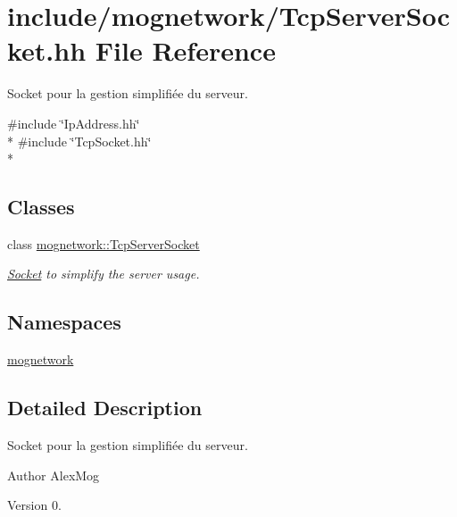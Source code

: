 \hypertarget{_tcp_server_socket_8hh}{\section{include/mognetwork/\-Tcp\-Server\-Socket.hh File Reference}
\label{_tcp_server_socket_8hh}
}


Socket pour la gestion simplifiée du serveur.  


{\ttfamily \#include \char`\"{}Ip\-Address.\-hh\char`\"{}}\\*
{\ttfamily \#include \char`\"{}Tcp\-Socket.\-hh\char`\"{}}\\*
\subsection*{Classes}
\begin{DoxyCompactItemize}
\item 
class \hyperlink{classmognetwork_1_1_tcp_server_socket}{mognetwork\-::\-Tcp\-Server\-Socket}
\begin{DoxyCompactList}\small\item\em \hyperlink{classmognetwork_1_1_socket}{Socket} to simplify the server usage. \end{DoxyCompactList}\end{DoxyCompactItemize}
\subsection*{Namespaces}
\begin{DoxyCompactItemize}
\item 
\hyperlink{namespacemognetwork}{mognetwork}
\end{DoxyCompactItemize}


\subsection{Detailed Description}
Socket pour la gestion simplifiée du serveur. \begin{DoxyAuthor}{Author}
Alex\-Mog 
\end{DoxyAuthor}
\begin{DoxyVersion}{Version}
0. 
\end{DoxyVersion}

